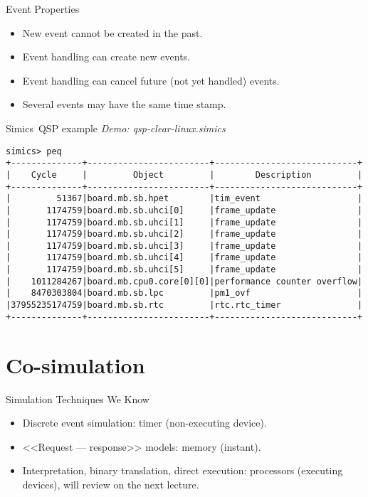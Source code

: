 \begin{frame}{Event Properties}
\begin{itemize}
\item New event cannot be created in the past.
\item Event handling can create new events.
\item Event handling can cancel future (not yet handled) events.
\item Several events may have the same time stamp.
\end{itemize}
\end{frame}

\begin{frame}[fragile]{Simics\reg~QSP example}
\emph{Demo: qsp-clear-linux.simics}
\footnotesize{\begin{verbatim}
simics> peq
+--------------+------------------------+----------------------------+
|    Cycle     |         Object         |        Description         |
+--------------+------------------------+----------------------------+
|         51367|board.mb.sb.hpet        |tim_event                   |
|       1174759|board.mb.sb.uhci[0]     |frame_update                |
|       1174759|board.mb.sb.uhci[1]     |frame_update                |
|       1174759|board.mb.sb.uhci[2]     |frame_update                |
|       1174759|board.mb.sb.uhci[3]     |frame_update                |
|       1174759|board.mb.sb.uhci[4]     |frame_update                |
|       1174759|board.mb.sb.uhci[5]     |frame_update                |
|    1011284267|board.mb.cpu0.core[0][0]|performance counter overflow|
|    8470303804|board.mb.sb.lpc         |pm1_ovf                     |
|37955235174759|board.mb.sb.rtc         |rtc.rtc_timer               |
+--------------+------------------------+----------------------------+
\end{verbatim}}
\end{frame}

\section{Co-simulation}

\begin{frame}{Simulation Techniques We Know}
\begin{itemize}
  \item Discrete event simulation: timer (non-executing device).
  \item{<<Request --- response>> models: memory (instant).}
  \item Interpretation, binary translation, direct execution:
    processors (executing devices), will review on the next lecture.
\end{itemize}
\end{frame}


